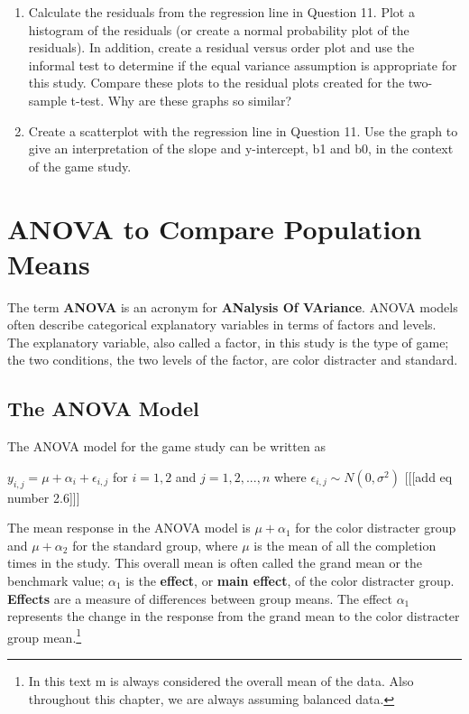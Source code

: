\documentclass[
]{report}
\theoremstyle{definition}
\theoremstyle{definition}
\theoremstyle{definition}
\theoremstyle{definition}
\theoremstyle{remark}
\begin{document}
\begin{enumerate}
\def\labelenumi{\arabic{enumi}.}
\setcounter{enumi}{13}
\item
  Calculate the residuals from the regression line in Question 11. Plot a histogram of the residuals (or create a normal probability plot of the residuals). In addition, create a residual versus order plot and use the informal test to determine if the equal variance assumption is appropriate for this study. Compare these plots to the residual plots created for the two-sample t-test. Why are these graphs so similar?
\item
  Create a scatterplot with the regression line in Question 11. Use the graph to give an interpretation of the slope and y-intercept, b1 and b0, in the context of the game study.
\end{enumerate}

\newpage

\hypertarget{anova-to-compare-population-means}{%
\section{ANOVA to Compare Population Means}\label{anova-to-compare-population-means}}

The term \textbf{ANOVA} is an acronym for \textbf{ANalysis Of VAriance}. ANOVA models often describe categorical explanatory variables in terms of factors and levels. The explanatory variable, also called a factor, in
this study is the type of game; the two conditions, the two levels of the factor, are color distracter and standard.

\hypertarget{the-anova-model}{%
\subsection{The ANOVA Model}\label{the-anova-model}}

The ANOVA model for the game study can be written as

\(y_{i,j} = \mu + \alpha_i + \epsilon_{i,j}\) for \(i = 1, 2\) and \(j = 1, 2, ... , n\) where \(\epsilon_{i,j} \sim N(0,\sigma^2)\)
{[}{[}{[}add eq number 2.6{]}{]}{]}

The mean response in the ANOVA model is \(\mu + \alpha_1\) for the color distracter group and \(\mu + \alpha_2\) for the standard group, where \(\mu\) is the mean of all the completion times in the study. This overall mean is often called the grand mean or the benchmark value; \(\alpha_1\) is the \textbf{effect}, or \textbf{main effect}, of the color distracter group. \textbf{Effects} are a measure of differences between group means. The effect \(\alpha_1\) represents the change in the response from the grand mean to the color distracter group mean.\footnote{In this text m is always considered the overall mean of the data. Also throughout this chapter, we are always assuming balanced data.}
\end{document}
